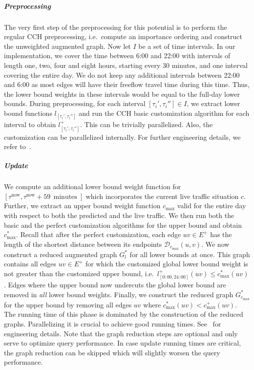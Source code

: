 \documentclass[a4paper,UKenglish,cleveref, autoref, thm-restate,anonymous]{lipics-v2021}
\newcommand*{\comb}{c}
\newcommand*{\dist}{\mathcal{D}}
\begin{document}
\subparagraph{Preprocessing}
The very first step of the preprocessing for this potential is to perform the regular CCH preprocessing, i.e.\ compute an importance ordering and construct the unweighted augmented graph.
Now let $I$ be a set of time intervals.
In our implementation,
we cover the time between 6:00 and 22:00 with intervals of length one, two, four and eight hours, starting every 30 minutes,
and one interval covering the entire day.
We do not keep any additional intervals between 22:00 and 6:00 as most edges will have their freeflow travel time during this time.
Thus, the lower bound weights in these intervals would be equal to the full-day lower bounds.
During preprocessing, for each interval $[\tau_i', \tau_i''] \in I$, we extract lower bound functions $l_{[\tau_i', \tau_i'']}$ and run the CCH basic customization algorithm for each interval to obtain $l_{[\tau_i', \tau_i'']}^+$.
This can be trivially parallelized.
Also, the customization can be parallelized internally.
For further engineering details, we refer to~\cite{dsw-cch-15,bsw-rttau-19,ghuw-fbndocch-19}.

\subparagraph{Update}
We compute an additional lower bound weight function for $[\tau^{\operatorname{now}}, \tau^{\operatorname{now}} + 59\,\operatorname{minutes}]$ which incorporates the current live traffic situation $\comb$.
Further, we extract an upper bound weight function $\comb_{\max}$ valid for the entire day with respect to both the predicted and the live traffic.
We then run both the basic and the perfect customization algorithms for the upper bound and obtain $\comb^*_{\max}$.
Recall that after the perfect customization, each edge $uv \in E^+$ has the length of the shortest distance between its endpoints $\dist_{\comb_{\max}}(u,v)$.
We now construct a reduced augmented graph $G^*_l$ for all lower bounds at once.
This graph contains all edges $uv \in E^+$ for which the customized global lower bound weight is not greater than the customized upper bound, i.e.\ $l_{[0:00, 24:00]}^+(uv) \leq \comb^*_{\max}(uv)$.
Edges where the upper bound now undercuts the global lower bound are removed in \emph{all} lower bound weights.
Finally, we construct the reduced graph $G^*_{\comb_{\max}}$ for the upper bound by removing all edges $uv$ where $\comb^*_{\max}(uv) < \comb^+_{\max}(uv)$.
The running time of this phase is dominated by the construction of the reduced graphs.
Parallelizing it is crucial to achieve good running times.
See~\cite{bsw-rttau-19} for engineering details.
Note that the graph reduction steps are optional and only serve to optimize query performance.
In case update running times are critical, the graph reduction can be skipped which will slightly worsen the query performance.
\end{document}
